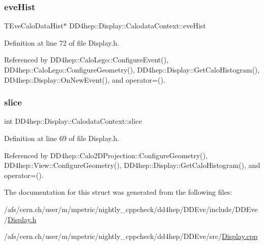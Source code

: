 \hypertarget{struct_d_d4hep_1_1_display_1_1_calodata_context_a55f5826e26bf9f967abeb22cd1f507d7}{}\label{struct_d_d4hep_1_1_display_1_1_calodata_context_a55f5826e26bf9f967abeb22cd1f507d7} 
\subsubsection{\texorpdfstring{eve\+Hist}{eveHist}}
{\footnotesize\ttfamily T\+Eve\+Calo\+Data\+Hist$\ast$ D\+D4hep\+::\+Display\+::\+Calodata\+Context\+::eve\+Hist}



Definition at line 72 of file Display.\+h.



Referenced by D\+D4hep\+::\+Calo\+Lego\+::\+Configure\+Event(), D\+D4hep\+::\+Calo\+Lego\+::\+Configure\+Geometry(), D\+D4hep\+::\+Display\+::\+Get\+Calo\+Histogram(), D\+D4hep\+::\+Display\+::\+On\+New\+Event(), and operator=().

\hypertarget{struct_d_d4hep_1_1_display_1_1_calodata_context_a7a289d192f903d7fd62f5db2b6631eea}{}\label{struct_d_d4hep_1_1_display_1_1_calodata_context_a7a289d192f903d7fd62f5db2b6631eea} 
\subsubsection{\texorpdfstring{slice}{slice}}
{\footnotesize\ttfamily int D\+D4hep\+::\+Display\+::\+Calodata\+Context\+::slice}



Definition at line 69 of file Display.\+h.



Referenced by D\+D4hep\+::\+Calo2\+D\+Projection\+::\+Configure\+Geometry(), D\+D4hep\+::\+View\+::\+Configure\+Geometry(), D\+D4hep\+::\+Display\+::\+Get\+Calo\+Histogram(), and operator=().



The documentation for this struct was generated from the following files\+:\begin{DoxyCompactItemize}
\item 
/afs/cern.\+ch/user/m/mpetric/nightly\+\_\+cppcheck/dd4hep/\+D\+D\+Eve/include/\+D\+D\+Eve/\hyperlink{_display_8h}{Display.\+h}\item 
/afs/cern.\+ch/user/m/mpetric/nightly\+\_\+cppcheck/dd4hep/\+D\+D\+Eve/src/\hyperlink{_display_8cpp}{Display.\+cpp}\end{DoxyCompactItemize}

